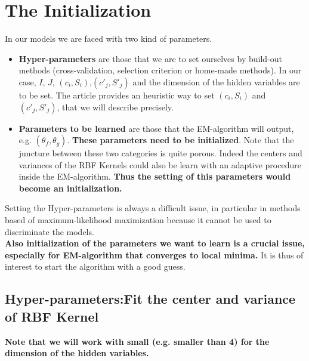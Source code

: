 \section{The Initialization}

In our models we are faced with two kind of parameters.
\begin{itemize}
\item \textbf{Hyper-parameters} are those that we are to set ourselves by build-out methods (cross-validation, selection criterion or home-made methods). In our case, $I$, $J$, $(c_i,S_i)$,$(c'_j,S'_j)$ and the dimension of the hidden variables are to be set. The article provides an heuristic way to set $(c_i,S_i)$ and $(c'_j,S'_j)$, that we will describe precisely.
\item \textbf{Parameters to be learned} are those that the EM-algorithm will output, e.g. $(\theta_f,\theta_g)$. \textbf{These parameters need to be initialized}. Note that the juncture between these two categories is quite porous. Indeed the centers and variances of the RBF Kernels could also be learn with an adaptive procedure inside the EM-algorithm. \textbf{Thus the setting of this parameters would become an initialization.}
\end{itemize}
Setting the Hyper-parameters is always a difficult issue, in particular in methods based of maximum-likelihood maximization because it cannot be used to discriminate the models.\\

\textbf{Also initialization of the parameters we want to learn is a crucial issue, especially for EM-algorithm that converges to local minima.} It is thus of interest to  start the algorithm with a good guess.\\



\subsection{Hyper-parameters:Fit the center and variance of RBF Kernel}
\textbf{Note that we will work with small (e.g. smaller than 4) for the dimension of the hidden variables.}\\



